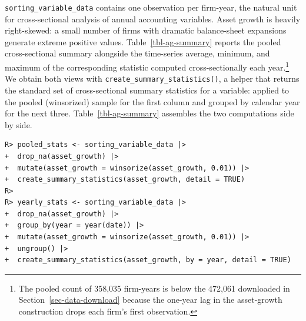 \documentclass[
  article]{jss}
\begin{document}
\texttt{sorting\_variable\_data} contains one observation per firm-year,
the natural unit for cross-sectional analysis of annual accounting
variables. Asset growth is heavily right-skewed: a small number of firms
with dramatic balance-sheet expansions generate extreme positive values.
Table~\ref{tbl-ag-summary} reports the pooled cross-sectional summary
alongside the time-series average, minimum, and maximum of the
corresponding statistic computed cross-sectionally each year.\footnote{The
  pooled count of 358,035 firm-years is below the 472,061 downloaded in
  Section~\ref{sec-data-download} because the one-year lag in the
  asset-growth construction drops each firm's first observation.} We
obtain both views with \texttt{create\_summary\_statistics()}, a
 helper that returns the standard set of
cross-sectional summary statistics for a variable: applied to the pooled
(winsorized) sample for the first column and grouped by calendar year
for the next three. Table~\ref{tbl-ag-summary} assembles the two
computations side by side.

\begin{verbatim}
R> pooled_stats <- sorting_variable_data |>
+  drop_na(asset_growth) |>
+  mutate(asset_growth = winsorize(asset_growth, 0.01)) |>
+  create_summary_statistics(asset_growth, detail = TRUE)
R> 
R> yearly_stats <- sorting_variable_data |>
+  drop_na(asset_growth) |>
+  group_by(year = year(date)) |>
+  mutate(asset_growth = winsorize(asset_growth, 0.01)) |>
+  ungroup() |>
+  create_summary_statistics(asset_growth, by = year, detail = TRUE)
\end{verbatim}
\end{document}
